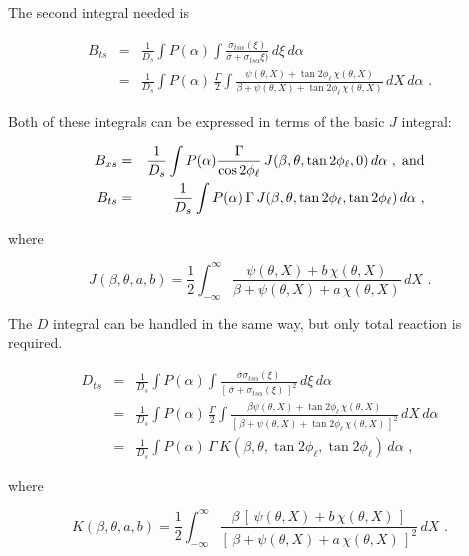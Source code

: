 The second integral needed is

\begin{eqnarray}
   B_{ts} &=& \frac{1}{D_s}\int P(\alpha)
       \int\frac{\sigma_{ts\alpha}(\xi)}
        {\overline{\sigma}+\sigma_{ts\alpha}\xi)}
          \,d\xi\,d\alpha \nonumber\\
  &=& \frac{1}{D_s}\int P(\alpha)\,\frac{\Gamma}{2}\int
      \frac{\psi(\theta,X)+\tan 2\phi_\ell\,\chi(\theta,X)}
      {\beta+\psi(\theta,X)+\tan 2\phi_\ell\,\chi(\theta,X)}
      \,dX\,d\alpha\,\,.
\end{eqnarray}

Both of these integrals can be expressed in terms of the basic
$J$ integral:

\begin{eqnarray}
   B_{xs} &=& \frac{1}{D_s}\int P(\alpha)\frac{\Gamma}
     {\cos 2\phi_\ell}\,J(\beta,\theta,\tan2\phi_\ell,0)\,d\alpha
        \,\,,\;\hbox{and} \nonumber\\
   B_{ts} &=& \frac{1}{D_s}\int P(\alpha)\,\Gamma\,
       J(\beta,\theta,\tan 2\phi_\ell,\tan 2\phi_\ell)\,d\alpha\,\,,
\end{eqnarray}

\noindent
where

\begin{equation}
  J(\beta,\theta,a,b)=\frac{1}{2}\int_{-\infty}^\infty
   \frac{\psi(\theta,X)+b\,\chi(\theta,X)}
    {\beta+\psi(\theta,X)+a\,\chi(\theta,X)}\,dX\,\,.
\end{equation}

\noindent
The $D$ integral can be handled in the same way, but only total
reaction is required.

\begin{eqnarray}
   D_{ts} &=& \frac{1}{D_s}\int P(\alpha)\int
    \frac{\overline{\sigma}\sigma_{ts\alpha}(\xi)}
     {[\,\overline{\sigma}+\sigma_{ts\alpha}(\xi)\,]^2}
     \,d\xi\,d\alpha \nonumber\\
  &=& \frac{1}{D_s}\int P(\alpha)\,\frac{\Gamma}{2}\int
     \frac{\beta\psi(\theta,X)+\tan 2\phi_\ell\,\chi(\theta,X)}
     {[\,\beta+\psi(\theta,X)+\tan 2\phi_\ell\,\chi(\theta,X)\,]^2}
      \,dX\,d\alpha \nonumber\\
  &=& \frac{1}{D_s}\int P(\alpha)\,\Gamma\, K(\beta,\theta,\tan 2\phi_\ell,
     \tan 2\phi_\ell)\,d\alpha\,\,,
\end{eqnarray}

\noindent
where

\begin{equation}
   K(\beta,\theta,a,b)=\frac{1}{2}\int_{-\infty}^\infty
   \frac{\beta\,[\,\psi(\theta,X)+b\,\chi(\theta,X)\,]}
     {[\,\beta+\psi(\theta,X)+a\,\chi(\theta,X)\,]^2}\,dX\,\,.
\end{equation}

